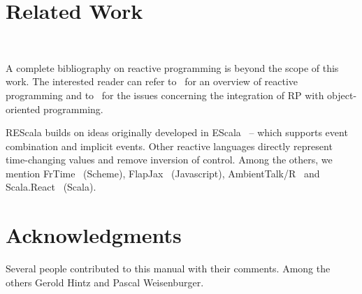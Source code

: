 \documentclass[10pt,a4paper]{article}
\begin{document}
\section{Related Work}~\label{sec:related}

A complete bibliography on reactive programming is beyond the scope of
this work. The interested reader can refer
to~\cite{rective-progr-survey} for an overview of reactive programming
and to~\cite{Salvaneschi:2013:RBO:2451436.2451442} for the issues
concerning the integration of RP with object-oriented programming.


REScala builds on ideas originally developed in
EScala~\cite{Gasiunas:2011:EME:1960275.1960303} -- which supports
event combination and implicit events. Other reactive languages
directly represent time-changing values and remove inversion of
control. Among the others, we mention
FrTime~\cite{DBLP:conf/esop/CooperK06} (Scheme),
FlapJax~\cite{Meyerovich:2009:FPL:1640089.1640091} (Javascript),
AmbientTalk/R~\cite{ambienttalkR} and
Scala.React~\cite{EPFL-REPORT-148043} (Scala).


\section{Acknowledgments}

Several people contributed to this manual with their comments. Among
the others Gerold Hintz and Pascal Weisenburger.




\end{document}
